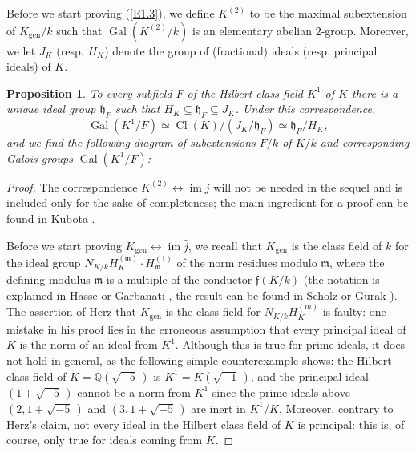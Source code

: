 \documentclass{amsart}
\newcommand{\Q}{\mathbb Q}
\newcommand{\fh}{{\mathfrak h}}
\newcommand{\fm}{{\mathfrak m}}
\newcommand{\frf}{{\mathfrak f}}
\newcommand{\hj}{\widehat{j}}
\newcommand{\Gal}{\operatorname{Gal}}
\newcommand{\Cl}{\operatorname{Cl}}
\newcommand{\leri}{\longleftrightarrow}
\newcommand{\im}{\operatorname{im}}
\newcommand{\gen}{{\operatorname{gen}}}
\newtheorem{prop}{Proposition}
\begin{document}
Before we start proving (\ref{E1.3}), we define $K^{(2)}$
to be the maximal subextension of $K_\gen/k$  such that
$\Gal(K^{(2)}/k)$ is an elementary abelian $2$-group. Moreover,
we let $J_K$ (resp. $H_K$) denote the group of (fractional)
ideals (resp. principal ideals) of $K$.

\begin{prop}\label{P2.1}
To every subfield $F$ of the Hilbert class field $K^1$ of $K$
there is a unique ideal group $\fh_F$ such that
$H_K \subseteq \fh_F \subseteq J_K$. Under this correspondence,
$$ \Gal(K^1/F) \simeq \Cl(K)/(J_K/\fh_F) \simeq \fh_F/H_K, $$
and we find the following diagram of subextensions $F/k$ of $K/k$
and corresponding Galois groups $\Gal(K^1/F)$:
\begin{center}
\end{center}
\end{prop}

\begin{proof}
The correspondence $K^{(2)} \leri \im j$ will not be needed
in the sequel and is included only for the sake of completeness;
the main ingredient for a proof can be found in Kubota
\cite[Hilfssatz 16]{Kub2}.

Before we start proving $K_\gen \leri \im \hj$, we recall that
$K_\gen$ is the class field of $k$ for the ideal group
$N_{K/k} H_K^{(\fm)} \cdot H_{\fm}^{(1)}$ of the norm residues
modulo $\fm$, where the defining modulus $\fm$ is a multiple of
the conductor $\frf(K/k)$ (the notation is explained in Hasse
\cite{HasB} or Garbanati \cite{Gar}, the result can be found
in Scholz \cite{Sch2} or Gurak \cite{Gur}). The assertion of
Herz \cite[Prop. 1]{Herz} that $K_\gen$ is the class field
for $N_{K/k} H_K^{(m)}$ is faulty: one mistake in his proof
lies in the erroneous assumption that every principal ideal
of $K$ is the norm of an ideal from $K^1$. Although this is
true for prime ideals, it does not hold in general, as the
following simple counterexample shows: the Hilbert class
field of $K = \Q(\sqrt{-5}\,)$ is $K^1 = K(\sqrt{-1}\,)$, and
the principal ideal $(1+\sqrt{-5}\,)$ cannot be a norm from $K^1$
since the prime ideals above $(2,1+\sqrt{-5}\,)$ and
$(3,1+\sqrt{-5}\,)$ are inert in $K^1/K$. Moreover, contrary to
Herz's claim, not every ideal in the Hilbert class field of $K$
is principal: this is, of course, only true for ideals coming
from $K$.
\end{proof}
\end{document}
